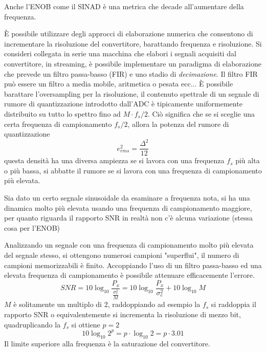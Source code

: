 Anche l'ENOB come il SINAD è una metrica che decade all'aumentare della frequenza.

È possibile utilizzare degli approcci di elaborazione numerica che consentono 
di incrementare la risoluzione del convertitore, barattando frequenza e 
risoluzione.
Si consideri collegata in serie una macchina che elabori i segnali acquisiti 
dal convertitore, in streaming, è possibile implementare un paradigma di 
elaborazione
che prevede un filtro passa-basso (FIR) e uno stadio di \textit{decimazione}. 
Il filtro FIR può essere un filtro a media mobile, aritmetica o pesata ecc... È 
possibile barattare l'oversampling per la risoluzione, il contenuto spettrale 
di un segnale di rumore di quantizzazione introdotto dall'ADC è tipicamente 
uniformemente distribuito su tutto lo spettro fino ad $M\cdot f_s/2$. Ciò 
significa che se si sceglie una certa frequenza di campionamento $f_s/2$, allora
la potenza del rumore di quantizzazione
$$
e^2_{rms} = \frac{\Delta^2}{12} 
$$
questa densità ha una diversa ampiezza se si lavora con una frequenza $f_s$ più 
alta o 
più bassa, si abbatte il rumore se si lavora con una frequenza di campionamento 
più elevata.

Sia dato un certo segnale sinusoidale da esaminare a frequenza nota, si ha una 
dinamica molto più elevata usando una frequenza di campionamento maggiore, per 
quanto riguarda il rapporto SNR in realtà non c'è alcuna variazione (stessa 
cosa per l'ENOB)

Analizzando un segnale con una frequenza di campionamento molto più elevata del 
segnale stesso, si ottengono numerosi campioni "superflui", il numero di 
campioni memorizzabili è finito. Accoppiando l'uso di un filtro passa-basso ed 
una elevata frequenza di campionamento è possibile attenuare efficacemente 
l'errore.
$$
SNR = 10\log_{10} \frac{P_x}{\frac{\sigma_e^2}{M}} = 10\log_{10} \frac{P_x}{\sigma_e^2} + 10\log_{10}M
$$
$M$ è solitamente un multiplo di 2, raddoppiando ad esempio la $f_s$ si 
raddoppia il rapporto SNR o equivalentemente si incrementa la risoluzione di 
mezzo bit, quadruplicando la $f_s$ si ottiene $p = 2$
$$
10\log_{10}2^p = p\cdot \log_{10}2 = p\cdot 3.01
$$
Il limite superiore alla frequenza è la saturazione del convertitore.

